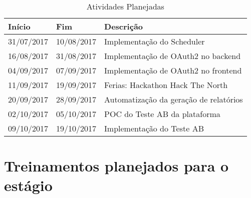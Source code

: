 \begin{table}[h!]
\begin{center}
\caption[Atividades Planejadas]
{Atividades Planejadas}\label{tab:tabPlan}

\begin{tabular}{llp{7cm}} \hline

\hline
\textbf{Início}    & \textbf{Fim} &  \textbf{Descrição}                             \\
\hline
31/07/2017        & 10/08/2017                & Implementação do Scheduler\\
16/08/2017        & 31/08/2017                & Implementação de \gls{OAuth2} no \gls{backend}\\
04/09/2017        & 07/09/2017                & Implementação de \gls{OAuth2} no \gls{frontend}\\
11/09/2017        & 19/09/2017                & Ferias: Hackathon Hack The North\\
20/09/2017        & 28/09/2017                & Automatização da geração de relatórios\\
02/10/2017        & 05/10/2017                & \gls{POC} do \gls{Teste AB} da plataforma\\
09/10/2017        & 19/10/2017                & Implementação do \gls{Teste AB}\\

\hline

\hline
\end{tabular}
\end{center}
\end{table}

\section{Treinamentos planejados para o estágio}

